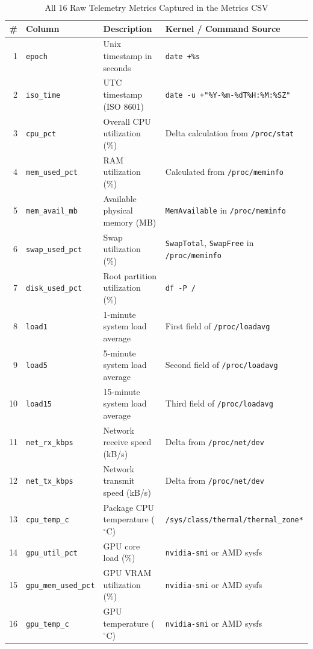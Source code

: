 \begin{table}[htbp]
    \centering
    \small
    \begin{tabularx}{\textwidth}{rllX}
        \toprule
        \# & Column & Description & Kernel / Command Source \\
        \midrule
        1 & \texttt{epoch} & Unix timestamp in seconds & \texttt{date +\%s} \\
        2 & \texttt{iso\_time} & UTC timestamp (ISO 8601) & \texttt{date -u +"\%Y-\%m-\%dT\%H:\%M:\%SZ"} \\
        3 & \texttt{cpu\_pct} & Overall CPU utilization (\%) & Delta calculation from \texttt{/proc/stat} \\
        4 & \texttt{mem\_used\_pct} & RAM utilization (\%) & Calculated from \texttt{/proc/meminfo} \\
        5 & \texttt{mem\_avail\_mb} & Available physical memory (MB) & \texttt{MemAvailable} in \texttt{/proc/meminfo} \\
        6 & \texttt{swap\_used\_pct} & Swap utilization (\%) & \texttt{SwapTotal}, \texttt{SwapFree} in \texttt{/proc/meminfo} \\
        7 & \texttt{disk\_used\_pct} & Root partition utilization (\%) & \texttt{df -P /} \\
        8 & \texttt{load1} & 1-minute system load average & First field of \texttt{/proc/loadavg} \\
        9 & \texttt{load5} & 5-minute system load average & Second field of \texttt{/proc/loadavg} \\
        10 & \texttt{load15} & 15-minute system load average & Third field of \texttt{/proc/loadavg} \\
        11 & \texttt{net\_rx\_kbps} & Network receive speed (kB/s) & Delta from \texttt{/proc/net/dev} \\
        12 & \texttt{net\_tx\_kbps} & Network transmit speed (kB/s) & Delta from \texttt{/proc/net/dev} \\
        13 & \texttt{cpu\_temp\_c} & Package CPU temperature ($^\circ$C) & \texttt{/sys/class/thermal/thermal\_zone*} \\
        14 & \texttt{gpu\_util\_pct} & GPU core load (\%) & \texttt{nvidia-smi} or AMD sysfs \\
        15 & \texttt{gpu\_mem\_used\_pct} & GPU VRAM utilization (\%) & \texttt{nvidia-smi} or AMD sysfs \\
        16 & \texttt{gpu\_temp\_c} & GPU temperature ($^\circ$C) & \texttt{nvidia-smi} or AMD sysfs \\
        \bottomrule
    \end{tabularx}
    \caption{All 16 Raw Telemetry Metrics Captured in the Metrics CSV}
    \label{tab:metrics_columns}
\end{table}

